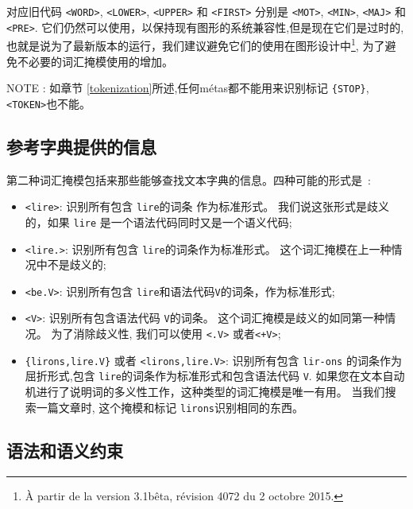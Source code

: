 \noindent  对应旧代码 \verb+<WORD>+, \verb+<LOWER>+, \verb+<UPPER>+ 和 \verb+<FIRST>+ 
 分别是 \verb+<MOT>+, \verb+<MIN>+, \verb+<MAJ>+ 和 \verb+<PRE>+.
 它们仍然可以使用，以保持现有图形的系统兼容性,但是现在它们是过时的,也就是说为了最新版本的运行，我们建议避免它们的使用在图形设计中\footnote{À partir de la version 3.1bêta, révision 4072 du 2 octobre 2015.},
为了避免不必要的词汇掩模使用的增加。

\bigskip
\noindent NOTE : 如章节 \ref{tokenization}所述,任何métas都不能用来识别标记  \verb+{STOP}+,  \verb+<TOKEN>+也不能。

\subsection{参考字典提供的信息}

第二种词汇掩模包括来那些能够查找文本字典的信息。四种可能的形式是~:


\bigskip
\begin{itemize}
\item \verb+<lire>+: 识别所有包含 \verb+lire+的词条 作为标准形式。
	我们说这张形式是歧义的，如果 \verb+lire+ 是一个语法代码同时又是一个语义代码;
  \item \verb+<lire.>+: 识别所有包含 \verb+lire+的词条作为标准形式。
  	  这个词汇掩模在上一种情况中不是歧义的;
  \item \verb+<be.V>+: 识别所有包含 \verb+lire+和语法代码\verb+V+的词条，作为标准形式;
  \item \verb+<V>+: 识别所有包含语法代码 \verb+V+的词条。
  	   这个词汇掩模是歧义的如同第一种情况。 为了消除歧义性, 我们可以使用
  	  \verb+<.V>+ 或者\verb$<+V>$;
\item \verb+{lirons,lire.V}+ 或者 \verb+<lirons,lire.V>+: 识别所有包含
	\verb+lir-+\newline\verb+ons+ 的词条作为屈折形式,包含 \verb+lire+的词条作为标准形式和包含语法代码
  \verb+V+. 如果您在文本自动机进行了说明词的多义性工作，这种类型的词汇掩模是唯一有用。
   当我们搜索一篇文章时, 这个掩模和标记 \verb+lirons+识别相同的东西。
\end{itemize}

\subsection{语法和语义约束}

